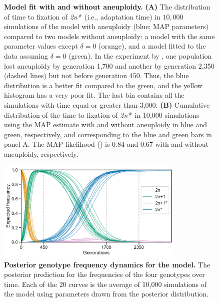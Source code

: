 \documentclass[12pt]{extarticle}
\newcommand{\eumt}{\emph{2n*}}
\begin{document}
\begin{figure}[p]
\begin{subfigure}{0.5\textwidth}
      \label{fig:fit-cumulative}
  \end{subfigure}
  \caption{
    \textbf{Model fit with and without aneuploidy.}
    \textbf{(A)} The distribution of time to fixation of \eumt\ (i.e., adaptation time) in $10,000$ simulations of the model with aneuploidy (blue; MAP parameters) compared to two models without aneuploidy: a model with the same parameter values except $\delta=0$ (orange), and a model fitted to the data assuming $\delta=0$ (green).
In the experiment by \citet{Yona2012}, one population lost aneuploidy by generation 1,700 and another by generation 2,350 (dashed lines) but not before generation 450. Thus, the blue distribution is a better fit compared to the green, and the yellow histogram has a very poor fit.
The last bin contains all the simulations with time equal or greater than 3,000.
    \textbf{(B)}
	Cumulative distribution of the time to fixation of \eumt\ in 10,000 simulations using the MAP estimate with and without aneuploidy in blue and green, respectively, and corresponding to the blue and green bars in panel A. The MAP likelihood () is 0.84 and 0.67 with and without aneuploidy, respectively.
     }
  \label{fig:2n*-fixation}
\end{figure}

\begin{figure}[p]
  \centering
\includegraphics[width=0.8\textwidth]{../figures/dynamics.pdf}
  \caption{
  \textbf{Posterior genotype frequency dynamics for the model.} 
  The posterior prediction for the frequencies of the four genotypes over time. Each of the 20 curves is the average of 10,000 simulations of the model using parameters drawn from the posterior distribution.
  }
  \label{fig:ppc-plot}
\end{figure}
\end{document}
